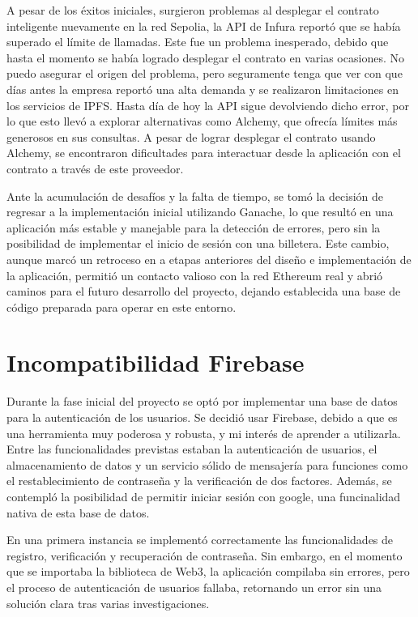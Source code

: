 A pesar de los éxitos iniciales, surgieron problemas al desplegar el contrato inteligente nuevamente en la red Sepolia, la API de Infura reportó que se había superado el límite de llamadas. 
Este fue un problema inesperado, debido que hasta el momento se había logrado desplegar el contrato en varias ocasiones. 
No puedo asegurar el origen del problema, pero seguramente tenga que ver con que días antes la empresa reportó una alta demanda y se realizaron limitaciones en los servicios de IPFS. 
Hasta día de hoy la API sigue devolviendo dicho error, por lo que esto llevó a explorar alternativas como Alchemy, que ofrecía límites más generosos en sus consultas. 
A pesar de lograr desplegar el contrato usando Alchemy, se encontraron dificultades para interactuar desde la aplicación con el contrato a través de este proveedor.

Ante la acumulación de desafíos y la falta de tiempo, se tomó la decisión de regresar a la implementación inicial utilizando Ganache, lo que resultó en una aplicación más estable y manejable para la detección de errores, pero sin la posibilidad de implementar el inicio de sesión con una billetera. Este cambio, aunque marcó un retroceso en a etapas anteriores del diseño e implementación de la aplicación, permitió un contacto valioso con la red Ethereum real y abrió caminos para el futuro desarrollo del proyecto, dejando establecida una base de código preparada para operar en este entorno.



\section{Incompatibilidad Firebase}

Durante la fase inicial del proyecto se optó por implementar una base de datos para la autenticación de los usuarios.
Se decidió usar Firebase, debido a que es una herramienta muy poderosa y robusta, y mi interés de aprender a utilizarla. Entre las funcionalidades previstas estaban la autenticación de usuarios, el almacenamiento de datos y un servicio sólido de mensajería para funciones como el restablecimiento de contraseña y la verificación de dos factores.
Además, se contempló la posibilidad de permitir iniciar sesión con google, una funcinalidad nativa de esta base de datos.

En una primera instancia se implementó correctamente las funcionalidades de registro, verificación y recuperación de contraseña.
Sin embargo, en el momento que se importaba la biblioteca de Web3, la aplicación compilaba sin errores, pero el proceso de autenticación de usuarios fallaba, retornando un error sin una solución clara tras varias investigaciones.

